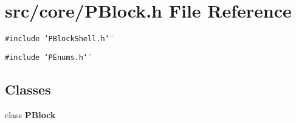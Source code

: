 \section{src/core/PBlock.h File Reference}
\label{PBlock_8h}


{\tt \#include \char`\"{}PBlock\-Shell.h\char`\"{}}\par
{\tt \#include \char`\"{}PEnums.h\char`\"{}}\par
\subsection*{Classes}
\begin{CompactItemize}
\item 
class {\bf PBlock}
\end{CompactItemize}
